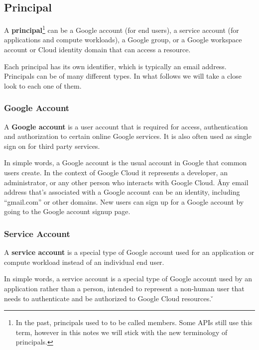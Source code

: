 \subsection{Principal}

\bd[Principal]
A \textbf{principal}\footnote{In the past, principals used to to be called members. Some APIs
still use this term, however in this notes we will stick with the new terminology of principals.} can be a Google
account (for end users), a service account (for applications and compute workloads), a Google group, or a Google
workspace account or Cloud identity domain that can access a resource.
\ed

Each principal has its own identifier, which is typically an email address. Principals can be of many different types.
In what follows we will take a close look to each one of them.

\subsubsection*{Google Account}

A \textbf{Google account} is a user account that is required for access, authentication and authorization to certain
online Google services. It is also often used as single sign on for third party services.
\ed

In simple words, a Google account is the usual account in Google that common users create. In the context of Google
Cloud it represents a developer, an administrator, or any other person who interacts with Google Cloud. \v

Any email address that's associated with a Google account can be an identity, including ``gmail.com'' or other domains.
New users can sign up for a Google account by going to the Google account signup page.

\subsubsection*{Service Account}

A \textbf{service account} is a special type of Google account used for an application or compute workload instead of
an individual end user.
\ed

In simple words, a service account is a special type of Google account used by an application rather than a person,
intended to represent a non-human user that needs to authenticate and be authorized to Google Cloud resources. \v

